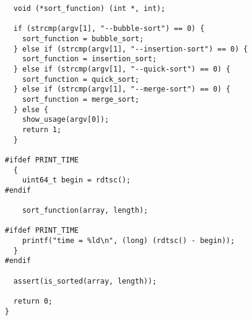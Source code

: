 \begin{verbatim}
  void (*sort_function) (int *, int);

  if (strcmp(argv[1], "--bubble-sort") == 0) {
    sort_function = bubble_sort;
  } else if (strcmp(argv[1], "--insertion-sort") == 0) {
    sort_function = insertion_sort;
  } else if (strcmp(argv[1], "--quick-sort") == 0) {
    sort_function = quick_sort;
  } else if (strcmp(argv[1], "--merge-sort") == 0) {
    sort_function = merge_sort;
  } else {
    show_usage(argv[0]);
    return 1;
  }

#ifdef PRINT_TIME
  {
    uint64_t begin = rdtsc();
#endif

    sort_function(array, length);

#ifdef PRINT_TIME
    printf("time = %ld\n", (long) (rdtsc() - begin));
  }
#endif

  assert(is_sorted(array, length));

  return 0;
}
\end{verbatim}

